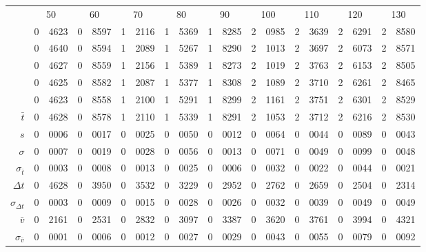 \begin{tabular}{r *9{r@{.}l}}
 &\multicolumn{2}{c}{50}
&\multicolumn{2}{c}{60}
&\multicolumn{2}{c}{70}
&\multicolumn{2}{c}{80}
&\multicolumn{2}{c}{90}
&\multicolumn{2}{c}{100}
&\multicolumn{2}{c}{110}
&\multicolumn{2}{c}{120}
&\multicolumn{2}{c}{130}\\[3 pt]
  &0&4623 &0&8597 &1&2116 &1&5369 &1&8285 &2&0985 &2&3639 &2&6291 &2&8580\\
  &0&4640 &0&8594 &1&2089 &1&5267 &1&8290 &2&1013 &2&3697 &2&6073 &2&8571\\
  &0&4627 &0&8559 &1&2156 &1&5389 &1&8273 &2&1019 &2&3763 &2&6153 &2&8505\\
  &0&4625 &0&8582 &1&2087 &1&5377 &1&8308 &2&1089 &2&3710 &2&6261 &2&8465\\
  &0&4623 &0&8558 &1&2100 &1&5291 &1&8299 &2&1161 &2&3751 &2&6301 &2&8529\\[3 pt]
$\bar{t}$ &0&4628 &0&8578 &1&2110 &1&5339 &1&8291 &2&1053 &2&3712 &2&6216 &2&8530\\
$s$ &0&0006 &0&0017 &0&0025 &0&0050 &0&0012 &0&0064 &0&0044 &0&0089 &0&0043\\
$\sigma$ &0&0007 &0&0019 &0&0028 &0&0056 &0&0013 &0&0071 &0&0049 &0&0099 &0&0048\\
$\sigma_{\bar{t}}$ &0&0003 &0&0008 &0&0013 &0&0025 &0&0006 &0&0032 &0&0022 &0&0044 &0&0021\\[3 pt]
$\Delta t$ &0&4628 &0&3950 &0&3532 &0&3229 &0&2952 &0&2762 &0&2659 &0&2504 &0&2314\\
$\sigma_{\Delta t}$ &0&0003 &0&0009 &0&0015 &0&0028 &0&0026 &0&0032 &0&0039 &0&0049 &0&0049\\
$\bar{v}$ &0&2161 &0&2531 &0&2832 &0&3097 &0&3387 &0&3620 &0&3761 &0&3994 &0&4321\\
$\sigma_{\bar{v}}$ &0&0001 &0&0006 &0&0012 &0&0027 &0&0029 &0&0043 &0&0055 &0&0079 &0&0092
\end{tabular}